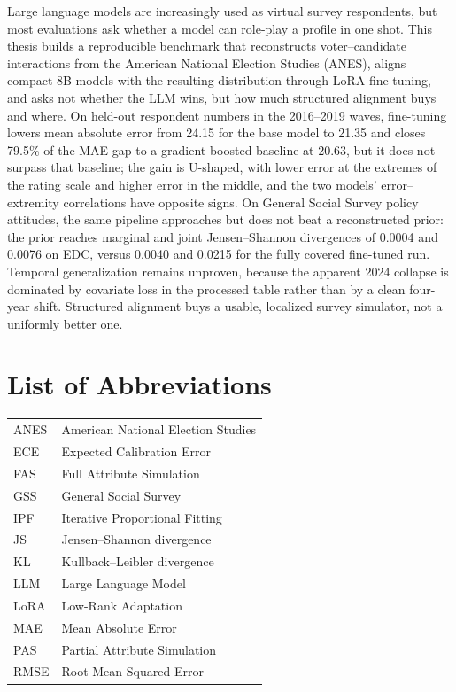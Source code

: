 \documentclass[12pt,a4paper]{report}
\begin{document}
Large language models are increasingly used as virtual survey respondents, but
most evaluations ask whether a model can role-play a profile in one shot. This
thesis builds a reproducible benchmark that reconstructs voter--candidate
interactions from the American National Election Studies (ANES), aligns compact
8B models with the resulting distribution through LoRA fine-tuning, and asks not
whether the LLM wins, but how much structured alignment buys and where. On
held-out respondent numbers in the 2016--2019 waves, fine-tuning lowers mean
absolute error from 24.15 for the base model to 21.35 and closes 79.5\% of the
MAE gap to a gradient-boosted baseline at 20.63, but it does not surpass that
baseline; the gain is U-shaped, with lower error at the extremes of the rating
scale and higher error in the middle, and the two models' error--extremity
correlations have opposite signs. On General Social Survey policy attitudes, the
same pipeline approaches but does not beat a reconstructed prior: the prior
reaches marginal and joint Jensen--Shannon divergences of 0.0004 and 0.0076 on
EDC, versus 0.0040 and 0.0215 for the fully covered fine-tuned run. Temporal
generalization remains unproven, because the apparent 2024 collapse is dominated
by covariate loss in the processed table rather than by a clean four-year shift.
Structured alignment buys a usable, localized survey simulator, not a uniformly
better one.

\setcounter{page}{0}
\pagestyle{prelim}
\clearpage
\tableofcontents
\clearpage
\listoffigures
\thispagestyle{prelim}
\clearpage
\listoftables
\thispagestyle{prelim}
\clearpage

\chapter*{List of Abbreviations}
\thispagestyle{prelim}
\begin{tabular}{ll}
ANES & American National Election Studies \\
ECE & Expected Calibration Error \\
FAS & Full Attribute Simulation \\
GSS & General Social Survey \\
IPF & Iterative Proportional Fitting \\
JS & Jensen--Shannon divergence \\
KL & Kullback--Leibler divergence \\
LLM & Large Language Model \\
LoRA & Low-Rank Adaptation \\
MAE & Mean Absolute Error \\
PAS & Partial Attribute Simulation \\
RMSE & Root Mean Squared Error \\
\end{tabular}
\end{document}
